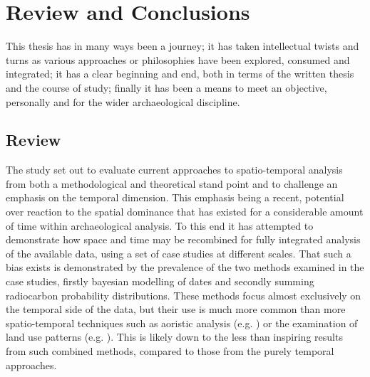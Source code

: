 \chapter{Review and Conclusions} %
\label{ch:conc}
This thesis has in many ways been a journey; it has taken intellectual twists and turns as various approaches or philosophies have been explored, consumed and integrated; it has a clear beginning and end, both in terms of the written thesis and the course of study; finally it has been a means to meet an objective, personally and for the wider archaeological discipline.

\section{Review}
The study set out to evaluate current approaches to spatio-temporal analysis from both a methodological and theoretical stand point and to challenge an emphasis on the temporal dimension. This emphasis being a recent, potential over reaction to the spatial dominance that has existed for a considerable amount of time within archaeological analysis. To this end it has attempted to demonstrate how space and time may be recombined for fully integrated analysis of the available data, using a set of case studies at different scales. That such a bias exists is demonstrated by the prevalence of the two methods examined in the case studies, firstly bayesian modelling of dates and secondly summing radiocarbon probability distributions. These methods focus almost exclusively on the temporal side of the data, but their use is much more common than more spatio-temporal techniques such as aoristic analysis (e.g. \citealp{Crema2012,Crema20101118}) or the examination of land use patterns (e.g. \citealp{ARCM:ARCM578}). This is likely down to the less than inspiring results from such combined methods, compared to those from the purely temporal approaches. 

